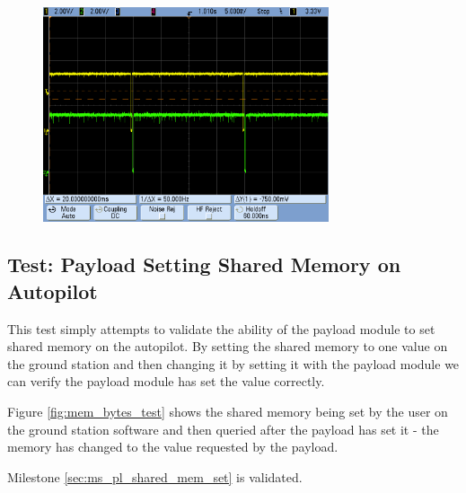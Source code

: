 \begin{figure}[H]
        \centering
        \includegraphics[width=0.75\textwidth]{testing_screenshots/transmit_tokens_succ.png}
        \label{fig:transmit_tokens_succ}
\end{figure}

\subsection{Test: Payload Setting Shared Memory on Autopilot}
\label{sec:test_pl_set_shared_mem}
This test simply attempts to validate the ability of the payload module to set shared memory on 
the autopilot. By setting the shared memory to one value on the ground station and then changing
it by setting it with the payload module we can verify the payload module has set the value correctly.

Figure \ref{fig:mem_bytes_test} shows the shared memory being set by the user
on the ground station software and then queried after the payload has set it - the memory
has changed to the value requested by the payload.

Milestone \ref{sec:ms_pl_shared_mem_set} is validated.

